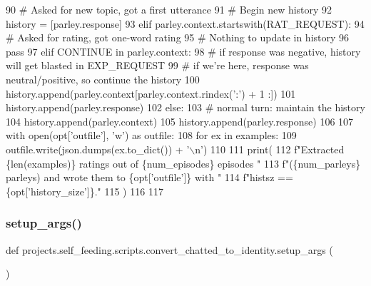 \begin{DoxyCode}
90                 \textcolor{comment}{# Asked for new topic, got a first utterance}
91                 \textcolor{comment}{# Begin new history}
92                 history = [parley.response]
93             \textcolor{keywordflow}{elif} parley.context.startswith(RAT\_REQUEST):
94                 \textcolor{comment}{# Asked for rating, got one-word rating}
95                 \textcolor{comment}{# Nothing to update in history}
96                 \textcolor{keywordflow}{pass}
97             \textcolor{keywordflow}{elif} CONTINUE \textcolor{keywordflow}{in} parley.context:
98                 \textcolor{comment}{# if response was negative, history will get blasted in EXP\_REQUEST}
99                 \textcolor{comment}{# if we're here, response was neutral/positive, so continue the history}
100                 history.append(parley.context[parley.context.rindex(\textcolor{stringliteral}{':'}) + 1 :])
101                 history.append(parley.response)
102             \textcolor{keywordflow}{else}:
103                 \textcolor{comment}{# normal turn: maintain the history}
104                 history.append(parley.context)
105                 history.append(parley.response)
106 
107     with open(opt[\textcolor{stringliteral}{'outfile'}], \textcolor{stringliteral}{'w'}) \textcolor{keyword}{as} outfile:
108         \textcolor{keywordflow}{for} ex \textcolor{keywordflow}{in} examples:
109             outfile.write(json.dumps(ex.to\_dict()) + \textcolor{stringliteral}{'\(\backslash\)n'})
110 
111     print(
112         f\textcolor{stringliteral}{"Extracted \{len(examples)\} ratings out of \{num\_episodes\} episodes "}
113         f\textcolor{stringliteral}{"(\{num\_parleys\} parleys) and wrote them to \{opt['outfile']\} with "}
114         f\textcolor{stringliteral}{"histsz == \{opt['history\_size']\}."}
115     )
116 
117 
\end{DoxyCode}
\mbox{\label{namespaceprojects_1_1self__feeding_1_1scripts_1_1convert__chatted__to__identity_a2179caf1a41e96bb38cad058863084a3}} 
\subsubsection{\texorpdfstring{setup\+\_\+args()}{setup\_args()}}
{\footnotesize\ttfamily def projects.\+self\+\_\+feeding.\+scripts.\+convert\+\_\+chatted\+\_\+to\+\_\+identity.\+setup\+\_\+args (\begin{DoxyParamCaption}{ }\end{DoxyParamCaption})}



